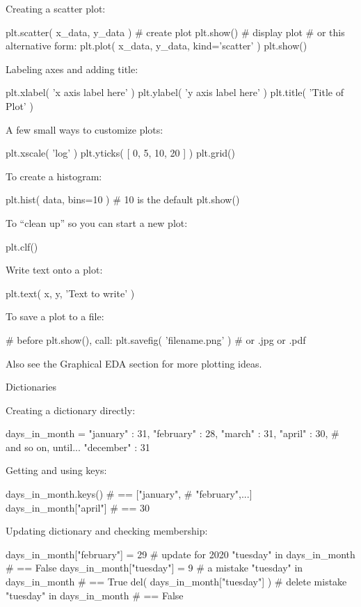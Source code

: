 \documentclass[a4paper,landscape,columns=3]{cheatsheet}
\def\sect#1{\begin{tcolorbox}[colback=blue!5!white,colframe=blue!75!black,size=title,leftrule=2mm]
    \large #1
\end{tcolorbox}}
\begin{document}
Creating a scatter plot:
\begin{python}
plt.scatter( x_data, y_data )  # create plot
plt.show()                     # display plot
# or this alternative form:
plt.plot( x_data, y_data, kind='scatter' )
plt.show()
\end{python}

Labeling axes and adding title:
\begin{python}
plt.xlabel( 'x axis label here' )
plt.ylabel( 'y axis label here' )
plt.title( 'Title of Plot' )
\end{python}

A few small ways to customize plots:
\begin{python}
plt.xscale( 'log' )
plt.yticks( [ 0, 5, 10, 20 ] )
plt.grid()
\end{python}

To create a histogram:
\begin{python}
plt.hist( data, bins=10 )      # 10 is the default
plt.show()
\end{python}

To ``clean up'' so you can start a new plot:
\begin{python}
plt.clf()
\end{python}

Write text onto a plot:
\begin{python}
plt.text( x, y, 'Text to write' )
\end{python}

To save a plot to a file:
\begin{python}
# before plt.show(), call:
plt.savefig( 'filename.png' )  # or .jpg or .pdf
\end{python}

Also see the Graphical EDA section for more plotting ideas.

\sect{Dictionaries}

Creating a dictionary directly:
\begin{python}
days_in_month = {
    "january"  : 31,
    "february" : 28,
    "march"    : 31,
    "april"    : 30,
    # and so on, until...
    "december" : 31
}
\end{python}

Getting and using keys:
\begin{python}
days_in_month.keys()    # == ["january",
                        #     "february",...]
days_in_month["april"]  # == 30
\end{python}

Updating dictionary and checking membership:
\begin{python}
days_in_month["february"] = 29   # update for 2020
"tuesday" in days_in_month       # == False
days_in_month["tuesday"] = 9     # a mistake
"tuesday" in days_in_month       # == True
del( days_in_month["tuesday"] )  # delete mistake
"tuesday" in days_in_month       # == False
\end{python}
\end{document}
